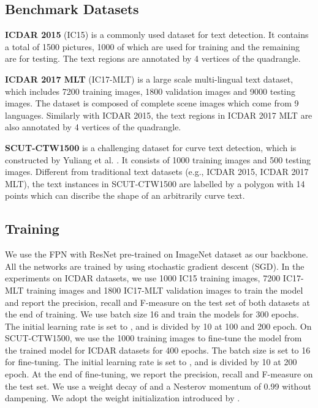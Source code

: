 \documentclass{article}
\begin{document}
\subsection{Benchmark Datasets}
{\bf{ICDAR 2015}} (IC15) \cite{karatzas2015icdar} is a commonly used dataset for text detection. It contains a total of 1500 pictures, 1000 of which are used for training and the remaining are for testing. The text regions are annotated by 4 vertices of the quadrangle.


{\bf{ICDAR 2017 MLT}} (IC17-MLT) \cite{icdar2017mlt} is a large scale multi-lingual text dataset, which includes 7200 training images, 1800 validation images and 9000 testing images. The dataset is composed of complete scene images which come from 9 languages. Similarly with ICDAR 2015, the text regions in ICDAR 2017 MLT are also annotated by 4 vertices of the quadrangle.


{\bf{SCUT-CTW1500}} is a challenging dataset for curve text detection, which is constructed by Yuliang et al. \cite{Liu2017Detecting}. It consists of 1000 training images and 500 testing images. Different from traditional text datasets (e.g., ICDAR 2015, ICDAR 2017 MLT), the text instances in SCUT-CTW1500 are labelled by a polygon with 14 points which can discribe the shape of an arbitrarily curve text.


\subsection{Training}
We use the FPN with ResNet \cite{he2016identity} pre-trained on ImageNet dataset \cite{deng2009imagenet} as our backbone. All the networks are trained by using stochastic gradient descent (SGD).
In the experiments on ICDAR datasets, we use 1000 IC15 training images, 7200 IC17-MLT training images and 1800 IC17-MLT validation images to train the model and report the precision, recall and F-measure on the test set of both datasets at the end of training. We use batch size 16 and train the models for 300 epochs. The initial learning rate is set to , and is divided by 10 at 100 and 200 epoch. 
On SCUT-CTW1500, we use the 1000 training images to fine-tune the model from the trained model for ICDAR datasets for 400 epochs. The batch size is set to 16 for fine-tuning. The initial learning rate is set to , and is divided by 10 at 200 epoch. At the end of fine-tuning, we report the precision, recall and F-measure on the test set.
We use a weight decay of  and a Nesterov momentum \cite{sutskever2013importance} of 0.99 without dampening. We adopt the weight initialization introduced by \cite{he2015delving}.
\end{document}
